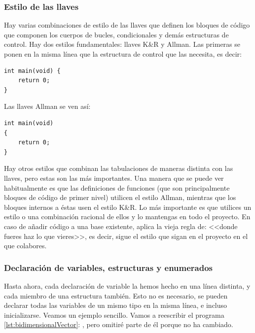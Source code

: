 \documentclass[a4paper]{article}
\begin{document}
\subsubsection{Estilo de las llaves}
Hay varias combinaciones de estilo de las llaves que definen los bloques de
código que componen los cuerpos de bucles, condicionales y demás estructuras
de control. Hay dos estilos fundamentales: llaves K\&R y Allman.
Las primeras se ponen en la misma línea que la estructura de control que
las necesita, es decir:

\noindent
\begin{minipage}[H]{\linewidth}
\mbox{}
\begin{lstlisting}[style=C,
caption={Ejemplo de llaves estilo K\&R},
label={lst:KRBrackets}]
int main(void) {
    return 0;
}
\end{lstlisting}
\end{minipage}

Las llaves Allman se ven así:

\noindent
\begin{minipage}[H]{\linewidth}
\mbox{}
\begin{lstlisting}[style=C,
caption={Ejemplo de llaves estilo Allman},
label={lst:AllmanBrackets}]
int main(void)
{
    return 0;
}
\end{lstlisting}
\end{minipage}

Hay otros estilos que combinan las tabulaciones de maneras distinta con las
llaves, pero estas son las más importantes. Una manera que se puede ver habitualmente
es que
las definiciones de funciones (que son principalmente bloques de código de
primer nivel) utilicen el estilo Allman, mientras que los bloques internos a
éstas usen el estilo K\&R. Lo más importante es que utilices un estilo o una
combinación racional de ellos y lo mantengas en todo el proyecto. En caso de
añadir código a una base existente, aplica la vieja regla de: <<donde fueres
haz lo que vieres>>, es decir, sigue el estilo que sigan en el proyecto en el
que colabores.

\subsubsection{Declaración de variables, estructuras y enumerados}
Hasta ahora, cada declaración de variable la hemos hecho en una línea distinta,
y cada miembro de una estructura también. Esto no es necesario, se pueden
declarar todas las variables de un mismo tipo en la misma línea, e incluso
inicializarse. Veamos un ejemplo sencillo. Vamos a reescribir el programa
\ref{lst:bidimensionalVector}: , pero omitiré
parte de él porque no ha cambiado.
\end{document}
